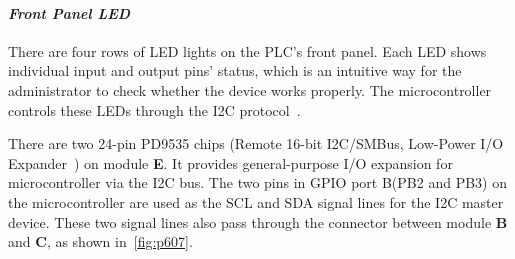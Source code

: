 \paragraph{\textbf{\textit{Front Panel LED}}} There are four rows of LED lights on the PLC's front panel. Each LED shows individual input and output pins' status, which is an intuitive way for the administrator to check whether the device works properly. The microcontroller controls these LEDs through the I2C protocol~\cite{semiconductors2000i2c}.

There are two 24-pin PD9535 chips (Remote 16-bit I2C/SMBus, Low-Power I/O Expander~\cite{pd9535}) on module \textbf{E}. It provides general-purpose I/O expansion for microcontroller via the I2C bus. The two pins in GPIO port B(PB2 and PB3) on the microcontroller are used as the SCL and SDA signal lines for the I2C master device. These two signal lines also pass through the connector between module \textbf{B} and \textbf{C}, as shown in~\autoref{fig:p607}.



